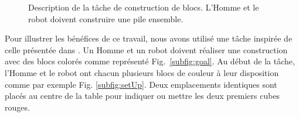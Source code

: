 \documentclass[english,a4paper,11pt,twoside]{StyleThese}
\begin{document}
\begin{figure}[!h]
\centering
	\hfill
    \caption{Description de la tâche de construction de blocs. L'Homme et le robot doivent construire une pile ensemble.}
    \label{fig:blocksBuildingTask}
\end{figure}

Pour illustrer les bénéfices de ce travail, nous avons utilisé une tâche inspirée de celle présentée dans \cite{clodic2014key}. Un Homme et un robot doivent réaliser une construction avec des blocs colorés comme représenté Fig.~\ref{subfig:goal}. Au début de la tâche, l'Homme et le robot ont chacun plusieurs blocs de couleur à leur disposition comme par exemple Fig. \ref{subfig:setUp}. Deux emplacements identiques sont placés au centre de la table pour indiquer ou mettre les deux premiers cubes rouges.
\end{document}
